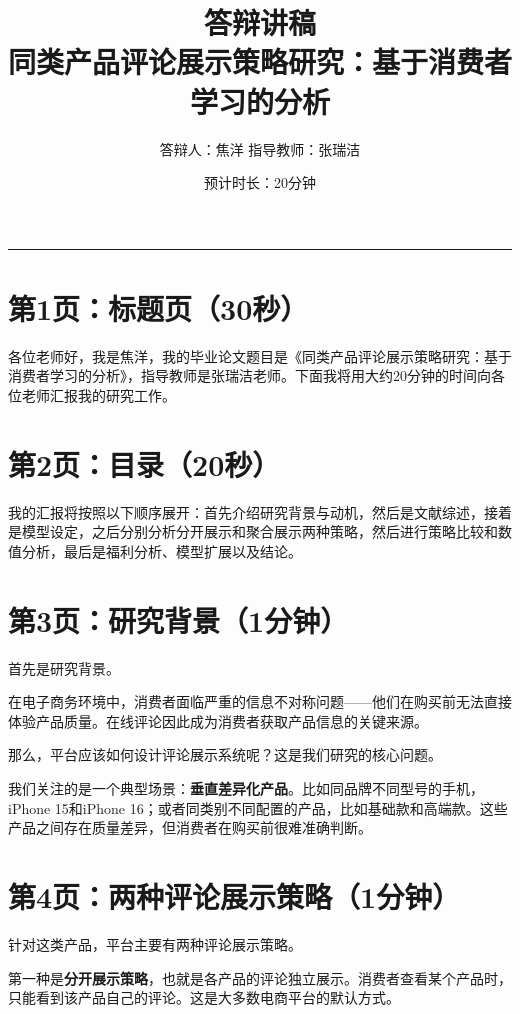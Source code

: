 \documentclass[12pt,a4paper]{article}
\title{\textbf{答辩讲稿}\\[0.5em]\large 同类产品评论展示策略研究：基于消费者学习的分析}
\author{答辩人：焦洋 \quad 指导教师：张瑞洁}
\date{预计时长：20分钟}
\begin{document}
\maketitle
\thispagestyle{empty}

\vspace{1em}
\hrule
\vspace{2em}

\section*{第1页：标题页（30秒）}

各位老师好，我是焦洋，我的毕业论文题目是《同类产品评论展示策略研究：基于消费者学习的分析》，指导教师是张瑞洁老师。下面我将用大约20分钟的时间向各位老师汇报我的研究工作。

\section*{第2页：目录（20秒）}

我的汇报将按照以下顺序展开：首先介绍研究背景与动机，然后是文献综述，接着是模型设定，之后分别分析分开展示和聚合展示两种策略，然后进行策略比较和数值分析，最后是福利分析、模型扩展以及结论。

\section*{第3页：研究背景（1分钟）}

首先是研究背景。

在电子商务环境中，消费者面临严重的信息不对称问题——他们在购买前无法直接体验产品质量。在线评论因此成为消费者获取产品信息的关键来源。

那么，平台应该如何设计评论展示系统呢？这是我们研究的核心问题。

我们关注的是一个典型场景：\textbf{垂直差异化产品}。比如同品牌不同型号的手机，iPhone 15和iPhone 16；或者同类别不同配置的产品，比如基础款和高端款。这些产品之间存在质量差异，但消费者在购买前很难准确判断。

\section*{第4页：两种评论展示策略（1分钟）}

针对这类产品，平台主要有两种评论展示策略。

第一种是\textbf{分开展示策略}，也就是各产品的评论独立展示。消费者查看某个产品时，只能看到该产品自己的评论。这是大多数电商平台的默认方式。
\end{document}
